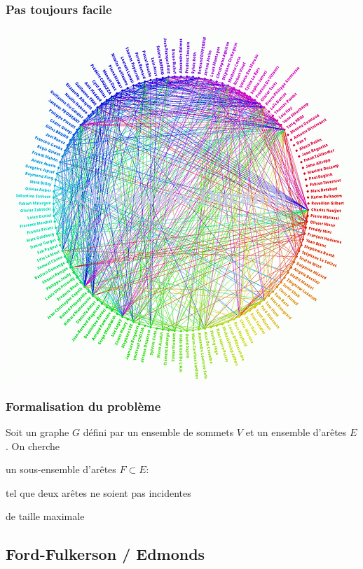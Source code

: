 \documentclass[11pt]{beamer}
\newenvironment{slide}[1]{%
\begin{frame}[environment=slide]
\frametitle{#1}
}{%
\end{frame}
}
\begin{document}
\begin{slide}{Pas toujours facile}
\includegraphics[scale=0.35]{facebookfriendwheel.jpg}
\end{slide}

\begin{slide}{Formalisation du problème}
Soit un graphe $G$ défini par un ensemble de sommets $V$ et un ensemble d'arêtes $E$. On cherche 

\vspace{0.5cm}

\pause

un sous-ensemble d'arêtes $F \subset E$:

\vspace{0.5cm}

\pause

tel que deux arêtes ne soient pas incidentes

\vspace{0.5cm}

\pause

de taille maximale

\end{slide}



\subsection{Ford-Fulkerson / Edmonds}
\end{document}
